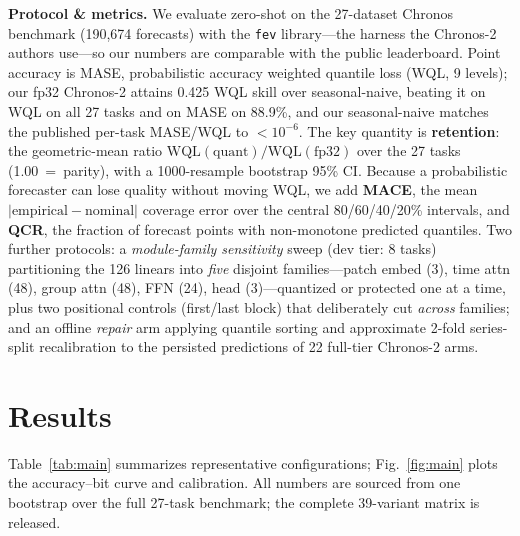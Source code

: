 \documentclass{article}
\begin{document}
\vspace{1pt}\noindent\textbf{Protocol \& metrics.} We evaluate zero-shot on the
27-dataset Chronos benchmark \citep{chronos} (190{,}674 forecasts) with the \texttt{fev}
library---the harness the Chronos-2 authors use---so our numbers are comparable with the
public leaderboard. Point accuracy is MASE, probabilistic accuracy weighted quantile loss
(WQL, 9 levels); our fp32 Chronos-2 attains 0.425 WQL skill over seasonal-naive, beating
it on WQL on all 27 tasks and on MASE on 88.9\%, and our seasonal-naive matches the
published per-task MASE/WQL to $<\!10^{-6}$. The key quantity is \textbf{retention}: the
geometric-mean ratio $\mathrm{WQL}(\text{quant})/\mathrm{WQL}(\text{fp32})$ over the 27
tasks (1.00~=~parity), with a 1000-resample bootstrap 95\% CI. Because a probabilistic
forecaster can lose quality without moving WQL, we add \textbf{MACE}, the mean
$|\text{empirical}-\text{nominal}|$ coverage error over the central 80/60/40/20\%
intervals, and \textbf{QCR}, the fraction of forecast points with non-monotone predicted
quantiles. Two further protocols: a \emph{module-family sensitivity} sweep (dev tier: 8
tasks) partitioning the 126 linears into \emph{five} disjoint families---patch embed (3),
time attn (48), group attn (48), FFN (24), head (3)---quantized or protected one at a
time, plus two positional controls (first/last block) that deliberately cut
\emph{across} families; and an offline \emph{repair} arm applying quantile sorting and
approximate 2-fold series-split recalibration to the persisted predictions of 22
full-tier Chronos-2 arms.

\section{Results}
Table~\ref{tab:main} summarizes representative configurations; Fig.~\ref{fig:main} plots
the accuracy--bit curve and calibration. All numbers are sourced from one bootstrap over
the full 27-task benchmark; the complete 39-variant matrix is released.
\end{document}
